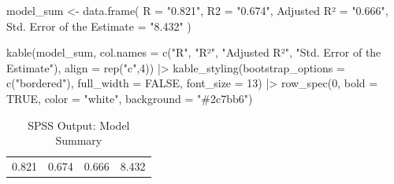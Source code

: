 \documentclass[
  12pt,
  letterpaper,
]{book}
\newenvironment{Shaded}{\begin{snugshade}}{\end{snugshade}}
\newcommand{\AttributeTok}[1]{\textcolor[rgb]{0.40,0.45,0.13}{#1}}
\newcommand{\ConstantTok}[1]{\textcolor[rgb]{0.56,0.35,0.01}{#1}}
\newcommand{\DecValTok}[1]{\textcolor[rgb]{0.68,0.00,0.00}{#1}}
\newcommand{\FunctionTok}[1]{\textcolor[rgb]{0.28,0.35,0.67}{#1}}
\newcommand{\NormalTok}[1]{\textcolor[rgb]{0.00,0.23,0.31}{#1}}
\newcommand{\OtherTok}[1]{\textcolor[rgb]{0.00,0.23,0.31}{#1}}
\newcommand{\SpecialCharTok}[1]{\textcolor[rgb]{0.37,0.37,0.37}{#1}}
\newcommand{\StringTok}[1]{\textcolor[rgb]{0.13,0.47,0.30}{#1}}
\begin{document}
\begin{Shaded}
\begin{Highlighting}[]
\NormalTok{model\_sum }\OtherTok{\textless{}{-}} \FunctionTok{data.frame}\NormalTok{(}
  \AttributeTok{R =} \StringTok{"0.821"}\NormalTok{,}
  \AttributeTok{R2 =} \StringTok{"0.674"}\NormalTok{,}
  \StringTok{\textasciigrave{}}\AttributeTok{Adjusted R²}\StringTok{\textasciigrave{}} \OtherTok{=} \StringTok{"0.666"}\NormalTok{,}
  \StringTok{\textasciigrave{}}\AttributeTok{Std. Error of the Estimate}\StringTok{\textasciigrave{}} \OtherTok{=} \StringTok{"8.432"}
\NormalTok{)}

\FunctionTok{kable}\NormalTok{(model\_sum,}
      \AttributeTok{col.names =} \FunctionTok{c}\NormalTok{(}\StringTok{"R"}\NormalTok{, }\StringTok{"R²"}\NormalTok{, }\StringTok{"Adjusted R²"}\NormalTok{, }\StringTok{"Std. Error of the Estimate"}\NormalTok{),}
      \AttributeTok{align =} \FunctionTok{rep}\NormalTok{(}\StringTok{"c"}\NormalTok{,}\DecValTok{4}\NormalTok{)) }\SpecialCharTok{|\textgreater{}}
  \FunctionTok{kable\_styling}\NormalTok{(}\AttributeTok{bootstrap\_options =} \FunctionTok{c}\NormalTok{(}\StringTok{"bordered"}\NormalTok{),}
                \AttributeTok{full\_width =} \ConstantTok{FALSE}\NormalTok{, }\AttributeTok{font\_size =} \DecValTok{13}\NormalTok{) }\SpecialCharTok{|\textgreater{}}
  \FunctionTok{row\_spec}\NormalTok{(}\DecValTok{0}\NormalTok{, }\AttributeTok{bold =} \ConstantTok{TRUE}\NormalTok{, }\AttributeTok{color =} \StringTok{"white"}\NormalTok{, }\AttributeTok{background =} \StringTok{"\#2c7bb6"}\NormalTok{)}
\end{Highlighting}
\end{Shaded}

\begingroup\fontsize{13}{15}\selectfont

\begin{longtable}[t]{cccc}

\caption{\label{tbl-spss-model}SPSS Output: Model Summary}

\tabularnewline

\toprule
\cellcolor[HTML]{2c7bb6}{\textcolor{white}{\textbf{R}}} & \cellcolor[HTML]{2c7bb6}{\textcolor{white}{\textbf{R²}}} & \cellcolor[HTML]{2c7bb6}{\textcolor{white}{\textbf{Adjusted R²}}} & \cellcolor[HTML]{2c7bb6}{\textcolor{white}{\textbf{Std. Error of the Estimate}}}\\
\midrule
0.821 & 0.674 & 0.666 & 8.432\\
\bottomrule

\end{longtable}
\end{document}
